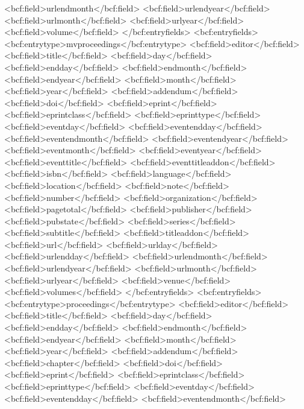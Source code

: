       <bcf:field>urlendmonth</bcf:field>
      <bcf:field>urlendyear</bcf:field>
      <bcf:field>urlmonth</bcf:field>
      <bcf:field>urlyear</bcf:field>
      <bcf:field>volume</bcf:field>
    </bcf:entryfields>
    <bcf:entryfields>
      <bcf:entrytype>mvproceedings</bcf:entrytype>
      <bcf:field>editor</bcf:field>
      <bcf:field>title</bcf:field>
      <bcf:field>day</bcf:field>
      <bcf:field>endday</bcf:field>
      <bcf:field>endmonth</bcf:field>
      <bcf:field>endyear</bcf:field>
      <bcf:field>month</bcf:field>
      <bcf:field>year</bcf:field>
      <bcf:field>addendum</bcf:field>
      <bcf:field>doi</bcf:field>
      <bcf:field>eprint</bcf:field>
      <bcf:field>eprintclass</bcf:field>
      <bcf:field>eprinttype</bcf:field>
      <bcf:field>eventday</bcf:field>
      <bcf:field>eventendday</bcf:field>
      <bcf:field>eventendmonth</bcf:field>
      <bcf:field>eventendyear</bcf:field>
      <bcf:field>eventmonth</bcf:field>
      <bcf:field>eventyear</bcf:field>
      <bcf:field>eventtitle</bcf:field>
      <bcf:field>eventtitleaddon</bcf:field>
      <bcf:field>isbn</bcf:field>
      <bcf:field>language</bcf:field>
      <bcf:field>location</bcf:field>
      <bcf:field>note</bcf:field>
      <bcf:field>number</bcf:field>
      <bcf:field>organization</bcf:field>
      <bcf:field>pagetotal</bcf:field>
      <bcf:field>publisher</bcf:field>
      <bcf:field>pubstate</bcf:field>
      <bcf:field>series</bcf:field>
      <bcf:field>subtitle</bcf:field>
      <bcf:field>titleaddon</bcf:field>
      <bcf:field>url</bcf:field>
      <bcf:field>urlday</bcf:field>
      <bcf:field>urlendday</bcf:field>
      <bcf:field>urlendmonth</bcf:field>
      <bcf:field>urlendyear</bcf:field>
      <bcf:field>urlmonth</bcf:field>
      <bcf:field>urlyear</bcf:field>
      <bcf:field>venue</bcf:field>
      <bcf:field>volumes</bcf:field>
    </bcf:entryfields>
    <bcf:entryfields>
      <bcf:entrytype>proceedings</bcf:entrytype>
      <bcf:field>editor</bcf:field>
      <bcf:field>title</bcf:field>
      <bcf:field>day</bcf:field>
      <bcf:field>endday</bcf:field>
      <bcf:field>endmonth</bcf:field>
      <bcf:field>endyear</bcf:field>
      <bcf:field>month</bcf:field>
      <bcf:field>year</bcf:field>
      <bcf:field>addendum</bcf:field>
      <bcf:field>chapter</bcf:field>
      <bcf:field>doi</bcf:field>
      <bcf:field>eprint</bcf:field>
      <bcf:field>eprintclass</bcf:field>
      <bcf:field>eprinttype</bcf:field>
      <bcf:field>eventday</bcf:field>
      <bcf:field>eventendday</bcf:field>
      <bcf:field>eventendmonth</bcf:field>
